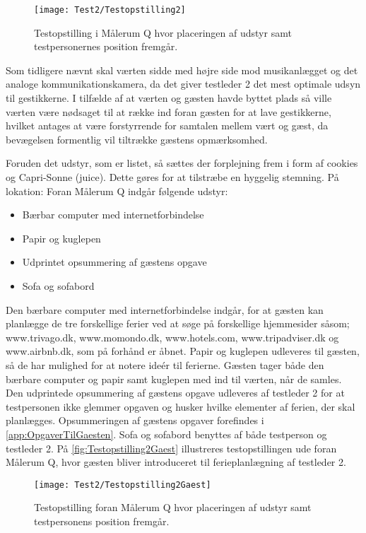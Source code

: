 %
\begin{figure}[H]
	\centering
	\texttt{[image: Test2/Testopstilling2]}
	\caption{Testopstilling i Målerum Q hvor placeringen af udstyr samt testpersonernes position fremgår.}
	\label{fig:Testopstilling2}
\end{figure}
\noindent
%
Som tidligere nævnt skal værten sidde med højre side mod musikanlægget og det analoge kommunikationskamera, da det giver testleder 2 det mest optimale udsyn til gestikkerne. I tilfælde af at værten og gæsten havde byttet plads så ville værten være nødsaget til at række ind foran gæsten for at lave gestikkerne, hvilket antages at være forstyrrende for samtalen mellem vært og gæst, da bevægelsen formentlig vil tiltrække gæstens opmærksomhed. 

Foruden det udstyr, som er listet, så sættes der forplejning frem i form af cookies og Capri-Sonne (juice). Dette gøres for at tilstræbe en hyggelig stemning. \blankline  
%
På lokation: Foran Målerum Q indgår følgende udstyr: 
\begin{itemize}
  \item Bærbar computer med internetforbindelse 
  \item Papir og kuglepen 
  \item Udprintet opsummering af gæstens opgave
  \item Sofa og sofabord\blankline
\noindent
\end{itemize}
%
Den bærbare computer med internetforbindelse indgår, for at gæsten kan planlægge de tre forskellige ferier ved at søge på forskellige hjemmesider såsom; www.trivago.dk, www.momondo.dk, www.hotels.com, www.tripadviser.dk og www.airbnb.dk, som på forhånd er åbnet. Papir og kuglepen udleveres til gæsten, så de har mulighed for at notere ideér til ferierne. Gæsten tager både den bærbare computer og papir samt kuglepen med ind til værten, når de samles. Den udprintede opsummering af gæstens opgave udleveres af testleder 2 for at testpersonen ikke glemmer opgaven og husker hvilke elementer af ferien, der skal planlægges. Opsummeringen af gæstens opgaver forefindes i \autoref{app:OpgaverTilGaesten}. Sofa og sofabord benyttes af både testperson og testleder 2. På \autoref{fig:Testopstilling2Gaest} illustreres testopstillingen ude foran Målerum Q, hvor gæsten bliver introduceret til ferieplanlægning af testleder 2.  
%
\begin{figure}[H]
	\centering
	\texttt{[image: Test2/Testopstilling2Gaest]}
	\caption{Testopstilling foran Målerum Q hvor placeringen af udstyr samt testpersonens position fremgår.}
	\label{fig:Testopstilling2Gaest}
\end{figure}
